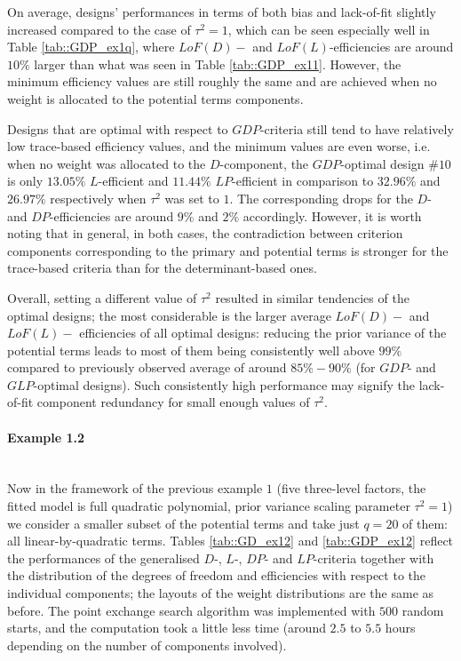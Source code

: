 On average, designs' performances in terms of both bias and lack-of-fit slightly increased compared to the case of $\tau^2=1$, which can be seen especially well in Table \ref{tab::GDP_ex1q}, where $LoF(D)-$ and $LoF(L)$-efficiencies are around $10\%$ larger than what was seen in Table \ref{tab::GDP_ex11}. However, the minimum efficiency values are still roughly the same and are achieved when no weight is allocated to the potential terms components.    

Designs that are optimal with respect to $GDP$-criteria still tend to have relatively low trace-based efficiency values, and the minimum values are even worse, i.e. when no weight was allocated to the $D$-component, the $GDP$-optimal design \#$10$ is only $13.05\%$ $L$-efficient and $11.44\%$ $LP$-efficient in comparison to $32.96\%$ and $26.97\%$ respectively when $\tau^2$ was set to $1$. The corresponding drops for the $D$- and $DP$-efficiencies are around $9\%$ and $2\%$ accordingly. However, it is worth noting that in general, in both cases, the contradiction between criterion components corresponding to the primary and potential terms is stronger for the trace-based criteria than for the determinant-based ones.

Overall, setting a different value of $\tau^2$ resulted in similar tendencies of the optimal designs; the most considerable is the larger average $LoF(D)-$ and $LoF(L)-$ efficiencies of all optimal designs: reducing the prior variance of the potential terms leads to most of them being consistently well above $99\%$ compared to previously observed average of around $85\%-90\%$ (for $GDP$- and $GLP$-optimal designs). Such consistently high performance may signify the lack-of-fit component redundancy for small enough values of $\tau^2$.

\paragraph{Example 1.2}\mbox{}\\
Now in the framework of the previous example $1$ (five three-level factors, the fitted model is full quadratic polynomial, prior variance scaling parameter $\tau^2=1$) we consider a smaller subset of the potential terms and take just $q=20$ of them: all linear-by-quadratic terms. Tables \ref{tab::GD_ex12} and \ref{tab::GDP_ex12} reflect the performances of the generalised $D$-, $L$-, $DP$- and $LP$-criteria together with the distribution of the degrees of freedom and efficiencies with respect to the individual components; the layouts of the weight distributions are the same as before. The point exchange search algorithm was implemented with $500$ random starts, and the computation took a little less time (around $2.5$ to $5.5$ hours depending on the number of components involved). 

